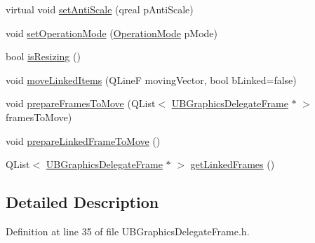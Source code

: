 \begin{DoxyCompactItemize}
\item 
virtual void \hyperlink{class_u_b_graphics_delegate_frame_aacd9c3fb5b977bd0251bdbab346578e7}{set\-Anti\-Scale} (qreal p\-Anti\-Scale)
\item 
void \hyperlink{class_u_b_graphics_delegate_frame_abc8c1975ac9f282d12afc7d19bbb43aa}{set\-Operation\-Mode} (\hyperlink{class_u_b_graphics_delegate_frame_aa3195d439757dd154944daea507f5b94}{Operation\-Mode} p\-Mode)
\item 
bool \hyperlink{class_u_b_graphics_delegate_frame_a057ceedb6d40b763735d1a3fe5490e39}{is\-Resizing} ()
\item 
void \hyperlink{class_u_b_graphics_delegate_frame_ac1bcd11a24c51e5702bbfc9ab648ddfa}{move\-Linked\-Items} (Q\-Line\-F moving\-Vector, bool b\-Linked=false)
\item 
void \hyperlink{class_u_b_graphics_delegate_frame_a45186f8e85cce27069b9d906448041c1}{prepare\-Frames\-To\-Move} (Q\-List$<$ \hyperlink{class_u_b_graphics_delegate_frame}{U\-B\-Graphics\-Delegate\-Frame} $\ast$ $>$ frames\-To\-Move)
\item 
void \hyperlink{class_u_b_graphics_delegate_frame_ada4ba3478789779bdc21e2499878ea4c}{prepare\-Linked\-Frame\-To\-Move} ()
\item 
Q\-List$<$ \hyperlink{class_u_b_graphics_delegate_frame}{U\-B\-Graphics\-Delegate\-Frame} $\ast$ $>$ \hyperlink{class_u_b_graphics_delegate_frame_a6a26360ddcd4e3c40fab06489ad0704a}{get\-Linked\-Frames} ()
\end{DoxyCompactItemize}


\subsection{Detailed Description}


Definition at line 35 of file U\-B\-Graphics\-Delegate\-Frame.\-h.



